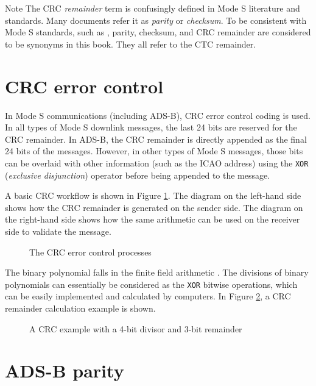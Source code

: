 \begin{notebox}{Note}
The CRC \emph{remainder} term is confusingly defined in Mode S literature and standards. Many documents refer it as \emph{parity} or \emph{checksum}. To be consistent with Mode S standards, such as \cite{icao9871v1, rtca2011mops}, parity, checksum, and CRC remainder are considered to be synonyms in this book. They all refer to the CTC remainder.
\end{notebox}

\section{CRC error control}

In Mode S communications (including ADS-B), CRC error control coding is used. In all types of Mode S downlink messages, the last 24 bits are reserved for the CRC remainder. In ADS-B, the CRC remainder is directly appended as the final 24 bits of the messages. However, in other types of Mode S messages, those bits can be overlaid with other information (such as the ICAO address) using the \texttt{XOR} (\emph{exclusive disjunction}) operator before being appended to the message.

A basic CRC workflow is shown in Figure \ref{fig:crc_flow}. The diagram on the left-hand side shows how the CRC remainder is generated on the sender side. The diagram on the right-hand side shows how the same arithmetic can be used on the receiver side to validate the message.

\begin{figure}[ht]
  
  \caption{The CRC error control processes}
  \label{fig:crc_flow}
\end{figure}


The binary polynomial falls in the finite field arithmetic \cite{carlitz1932}. The divisions of binary polynomials can essentially be considered as the \texttt{XOR} bitwise operations, which can be easily implemented and calculated by computers. In Figure \ref{fig:crc_example}, a CRC remainder calculation example is shown.

\begin{figure}[ht]
  
  \caption{A CRC example with a 4-bit divisor and 3-bit remainder}
  \label{fig:crc_example}
\end{figure}


\section{ADS-B parity}

